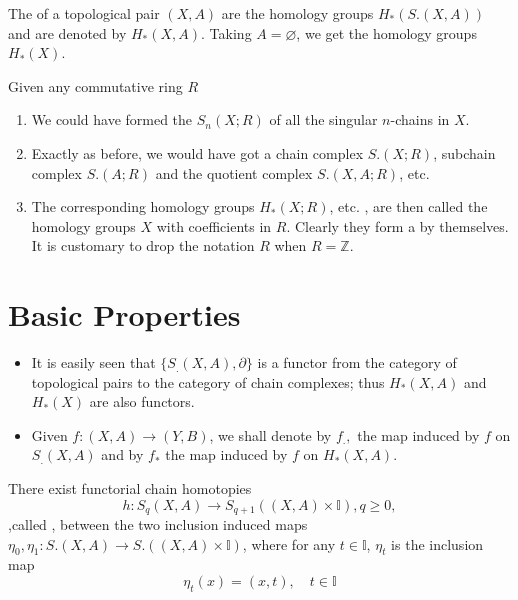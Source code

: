 \documentclass[../main.tex]{subfiles}
\begin{document}
\begin{definition}{}{}
The  of a topological pair $(X,A)$ are the homology groups $H_*(S.(X,A))$ and are denoted by $H_*(X,A)$. Taking $A = \varnothing$, we get the homology groups $H_*(X)$.
\end{definition}
\begin{remark}{}{}
Given any commutative ring $R$
\begin{enumerate}
    \item We could have formed the  $S_n(X;R)$ of all the singular $n$-chains in $X$.
    \item Exactly as before, we would have got a chain complex $S.(X;R)$, subchain complex $S.(A;R)$ and the quotient complex $S.(X,A;R)$, etc. 
    \item The corresponding homology groups $H_*(X;R)$, etc. , are then called the homology groups $X$ with coefficients in $R$. Clearly they form a  by themselves. It is customary to drop the notation $R$ when $R=\mathbb{Z}$.
\end{enumerate}

\end{remark}

\section{Basic Properties}
\begin{remark}
    \begin{itemize}
          \item  It is easily seen that $\{S_.(X,A), \partial\}$ is a functor from the category of topological pairs to the category of chain complexes; thus $H_*(X,A)$ and $H_*(X)$ are also functors. 
        \item Given $f : (X,A) \to (Y,B)$, we shall denote by $f_.,$ the map induced by $f$ on $S_.(X,A)$ and by $f_*$ the map induced by $f$ on $H_*(X,A)$.
    \end{itemize}
    
\end{remark}
\begin{lemma}{}{}
There exist functorial chain homotopies
$$ h : S_q(X, A) \to S_{q+1}((X, A) \times \mathbb{I}), q \geq 0, $$
,called , between the two inclusion induced maps $\eta_0, \eta_1 : S.(X, A) \to S.((X, A) \times \mathbb{I})$, where for any \(  t\in \mathbb{I}  \), \(  \eta _{t}  \) is the inclusion map \[
        \eta _{t}\left( x \right)=  \left( x,t \right) ,\quad t \in \mathbb{I}
        \]  
\end{lemma}
\end{document}
